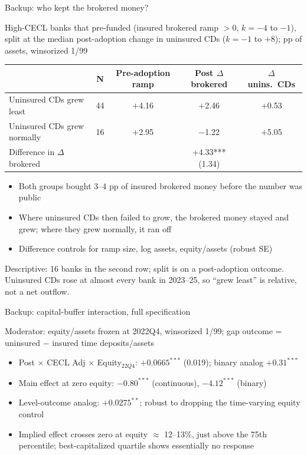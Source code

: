 \documentclass[aspectratio=169,10pt]{beamer}
\newcommand{\spec}[1]{{\vspace{-2mm}\textcolor{pgray}{\footnotesize #1}\par\vspace{1mm}}}
\newcommand{\pill}[2]{\hyperlink{#1}{\beamergotobutton{#2}}}
\begin{document}
\begin{frame}[label=appretention]{Backup: who kept the brokered money?}
  \spec{High-CECL banks that pre-funded (insured brokered ramp $>0$, $k=-4$ to $-1$), split at the median post-adoption change in uninsured CDs ($k=-1$ to $+8$); pp of assets, winsorized 1/99}
  \begin{center}
  \footnotesize
  \setlength{\tabcolsep}{6pt}
  \renewcommand{\arraystretch}{1.25}
  \begin{tabular}{lcccc}
    \toprule
    & N & Pre-adoption ramp & Post $\Delta$ brokered & $\Delta$ unins.\ CDs \\
    \midrule
    Uninsured CDs grew least & 44 & $+$4.16 & $+$2.46 & $+$0.53 \\
    Uninsured CDs grew normally & 16 & $+$2.95 & $-$1.22 & $+$5.05 \\
    \midrule
    Difference in $\Delta$ brokered & & & $+$4.33*** (1.34) & \\
    \bottomrule
  \end{tabular}
  \end{center}
  \begin{itemize}\footnotesize
    \item Both groups bought 3--4 pp of insured brokered money before the number was public
    \item Where uninsured CDs then failed to grow, the brokered money stayed and grew;
      where they grew normally, it ran off
    \item Difference controls for ramp size, log assets, equity/assets (robust SE)
  \end{itemize}
  {\scriptsize Descriptive: 16 banks in the second row; split is on a
  post-adoption outcome. Uninsured CDs rose at almost every bank in 2023--25, so
  ``grew least'' is relative, not a net outflow.} \hfill \pill{ftiming}{back}
\end{frame}

\begin{frame}[label=appcapital]{Backup: capital-buffer interaction, full specification}
  \spec{Moderator: equity/assets frozen at 2022Q4, winsorized 1/99; gap outcome = uninsured $-$ insured time deposits/assets}
  \begin{itemize}
    \item Post $\times$ CECL Adj $\times$ Equity$_{22Q4}$: $+0.0665^{***}$
      (0.019); binary analog $+0.31^{***}$
    \item Main effect at zero equity: $-0.80^{***}$ (continuous),
      $-4.12^{***}$ (binary)
    \item Level-outcome analog: $+0.0275^{**}$; robust to dropping the
      time-varying equity control
    \item Implied effect crosses zero at equity $\approx$ 12--13\%, just above
      the 75th percentile; best-capitalized quartile shows essentially no
      response
  \end{itemize}
  \hfill \pill{fcapital}{back}
\end{frame}
\end{document}

